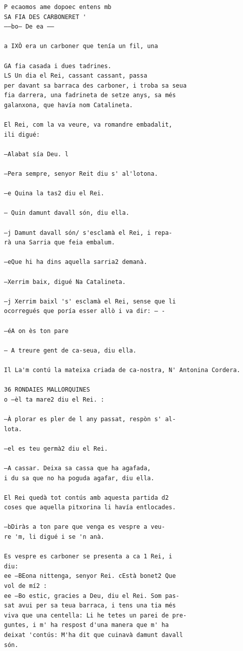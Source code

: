 \documentclass[
  letterpaper,
  DIV=11,
  numbers=noendperiod]{scrreprt}
\begin{document}
\begin{verbatim}
P ecaomos ame dopoec entens mb
SA FIA DES CARBONERET '
——bo— De ea ——

a IXÒ era un carboner que tenía un fil, una

GA fia casada i dues tadrines.
LS Un dia el Rei, cassant cassant, passa
per davant sa barraca des carboner, i troba sa seua
fia darrera, una fadrineta de setze anys, sa més
galanxona, que havía nom Catalineta.

El Rei, com la va veure, va romandre embadalit,
ili digué:

—Alabat sía Deu. l

—Pera sempre, senyor Reit diu s' al'lotona.

—e Quina la tas2 diu el Rei.

— Quin damunt davall són, diu ella.

—j Damunt davall són/ s'esclamà el Rei, i repa-
rà una Sarria que feia embalum.

—eQue hi ha dins aquella sarria2 demanà.

—Xerrim baix, digué Na Catalineta.

—j Xerrim baixl 's' esclamà el Rei, sense que li
ocorregués que poría esser allò i va dir: — -

—éA on ès ton pare

— A treure gent de ca-seua, diu ella.

Il La'm contú la mateixa criada de ca-nostra, N' Antonina Cordera.

36 RONDAIES MALLORQUINES
o —èl ta mare2 diu el Rei. :

—À plorar es pler de l any passat, respòn s' al-
lota.

—el es teu germà2 diu el Rei.

—A cassar. Deixa sa cassa que ha agafada,
i du sa que no ha poguda agafar, diu ella.

El Rei quedà tot contús amb aquesta partida d2
coses que aquella pitxorina li havía entlocades.

—bDiràs a ton pare que venga es vespre a veu-
re 'm, li digué i se 'n anà.

Es vespre es carboner se presenta a ca 1 Rei, i
diu:
ee —BEona nittenga, senyor Rei. cEstà bonet2 Que
vol de mí2 :
ee —Bo estic, gracies a Deu, diu el Rei. Som pas-
sat avui per sa teua barraca, i tens una tia més
viva que una centella: Li he tetes un parei de pre-
guntes, i m' ha respost d'una manera que m' ha
deixat 'contús: M'ha dit que cuinavà damunt davall
són.


\end{verbatim}
\end{document}
